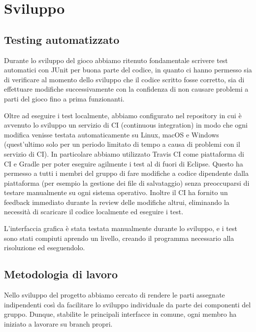 \chapter{Sviluppo}

\section{Testing automatizzato}

Durante lo sviluppo del gioco abbiamo ritenuto fondamentale scrivere
test automatici con JUnit per buona parte del codice, in quanto ci hanno
permesso sia di verificare al momento dello sviluppo che il codice
scritto fosse corretto, sia di effettuare modifiche successivamente con
la confidenza di non causare problemi a parti del gioco fino a prima
funzionanti.

Oltre ad eseguire i test localmente, abbiamo configurato nel repository in cui
è avvenuto lo sviluppo un servizio di CI (continuous integration) in modo che
ogni modifica venisse testata automaticamente su Linux, macOS e Windows
(quest'ultimo solo per un periodo limitato di tempo a causa di problemi con il
servizio di CI). In particolare abbiamo utilizzato Travis CI come piattaforma
di CI e Gradle per poter eseguire agilmente i test al di fuori di Eclipse.
Questo ha permesso a tutti i membri del gruppo di fare modifiche a codice
dipendente dalla piattaforma (per esempio la gestione dei file di salvataggio)
senza preoccuparsi di testare manualmente su ogni sistema operativo. Inoltre il
CI ha fornito un feedback immediato durante la review delle modifiche altrui,
eliminando la necessità di scaricare il codice localmente ed eseguire i test.

L'interfaccia grafica è stata testata manualmente durante lo sviluppo, e
i test sono stati compiuti aprendo un livello, creando il programma
necessario alla risoluzione ed eseguendolo.

\section{Metodologia di lavoro}

Nello sviluppo del progetto abbiamo cercato di rendere le parti
assegnate indipendenti così da facilitare lo sviluppo individuale da
parte dei componenti del gruppo. Dunque, stabilite le principali
interfacce in comune, ogni membro ha iniziato a lavorare su branch
propri.

